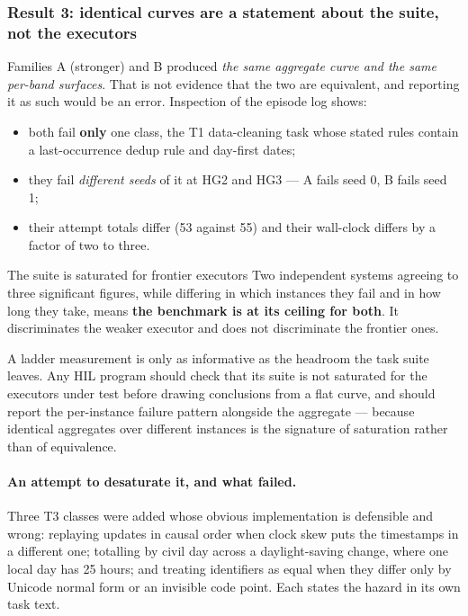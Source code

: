 \documentclass[11pt]{article}
\theoremstyle{definition}
\begin{document}
\subsubsection{Result 3: identical curves are a statement about the suite, not the executors}

Families A (stronger) and B produced \emph{the same aggregate curve and the same per-band surfaces}. That is not evidence that the two are equivalent, and reporting it as such would be an error. Inspection of the episode log shows:

\begin{itemize}
\item both fail \textbf{only} one class, the T1 data-cleaning task whose stated rules contain a last-occurrence dedup rule and day-first dates;
\item they fail \emph{different seeds} of it at HG2 and HG3 --- A fails seed 0, B fails seed 1;
\item their attempt totals differ (53 against 55) and their wall-clock differs by a factor of two to three.
\end{itemize}

\begin{cautionbox}{The suite is saturated for frontier executors}
Two independent systems agreeing to three significant figures, while differing in which instances they fail and in how long they take, means \textbf{the benchmark is at its ceiling for both}. It discriminates the weaker executor and does not discriminate the frontier ones.

A ladder measurement is only as informative as the headroom the task suite leaves. Any HIL program should check that its suite is not saturated for the executors under test before drawing conclusions from a flat curve, and should report the per-instance failure pattern alongside the aggregate --- because identical aggregates over different instances is the signature of saturation rather than of equivalence.
\end{cautionbox}

\paragraph{An attempt to desaturate it, and what failed.} Three T3 classes were
added whose obvious implementation is defensible and wrong: replaying updates in
causal order when clock skew puts the timestamps in a different one; totalling by
civil day across a daylight-saving change, where one local day has 25 hours; and
treating identifiers as equal when they differ only by Unicode normal form or an
invisible code point. Each states the hazard in its own task text.
\end{document}
